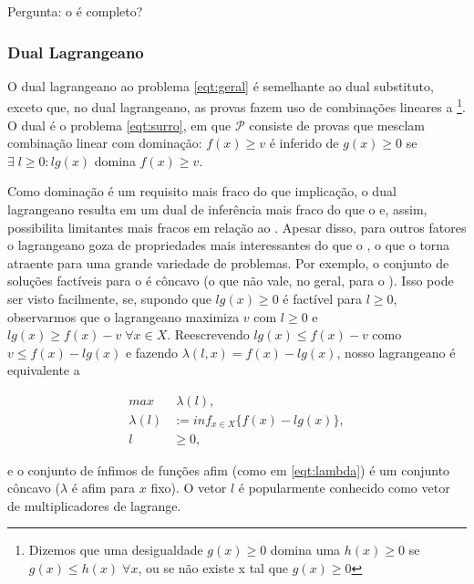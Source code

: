 Pergunta: o  é completo?

\subsubsection{Dual Lagrangeano}

O dual lagrangeano ao problema \ref{eqt:geral} é semelhante ao dual substituto, exceto que, no dual
lagrangeano, as provas fazem uso de combinações lineares a \footnote{Dizemos que uma
desigualdade $g(x) \geq 0$ domina uma $h(x) \geq 0$ se $g(x) \leq h(x) \;\forall x$, ou se não existe x
tal que $g(x) \geq 0$}. O dual é o problema \ref{eqt:surro}, em que $\mathcal{P}$ consiste de provas
que mesclam combinação linear com dominação: $f(x) \geq v$ é inferido de $g(x) \geq 0$ se $\exists
\; l \geq 0: lg(x)$ domina $f(x) \geq v$.

Como dominação é um requisito mais fraco do que implicação, o dual lagrangeano resulta em um dual de
inferência mais fraco do que o  e, assim, possibilita limitantes mais fracos
em relação ao . Apesar disso, para outros fatores o lagrangeano goza de propriedades mais
interessantes do que o , o que o torna atraente para uma grande variedade de problemas. Por exemplo,
o conjunto de soluções factíveis para o  é côncavo (o que não vale, no
geral, para o ). Isso pode ser visto
facilmente, se, supondo que $lg(x) \geq 0$ é factível para $l\geq0$, observarmos que o
lagrangeano maximiza $v$ com $l \geq 0$ e $lg(x) \geq f(x) - v \; \forall x \in X$. Reescrevendo $lg(x)
\leq f(x) - v$ como $v \leq f(x) - lg(x)$ e fazendo $\lambda(l,x) = f(x) - lg(x)$, nosso
lagrangeano é equivalente a

  \begin{align}
     max &\; \lambda(l),\\
     \lambda(l) &:=  inf_{x \in X}\{f(x) - lg(x)\},\label{eqt:lambda}\\
     l & \geq 0,
  \end{align}

\noindent e o conjunto de ínfimos de funções afim (como em \ref{eqt:lambda}) é um conjunto côncavo
($\lambda$ é afim para $x$ fixo). O vetor $l$ é popularmente conhecido como vetor de multiplicadores
de lagrange.





